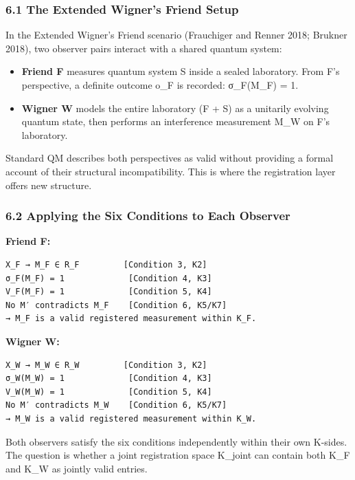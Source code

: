 \documentclass[
  11pt,
]{article}
\providecommand{\tightlist}{%
  \setlength{\itemsep}{0pt}\setlength{\parskip}{0pt}}
\begin{document}
\subsubsection{6.1 The Extended Wigner's Friend
Setup}\label{the-extended-wigners-friend-setup}

In the Extended Wigner's Friend scenario (Frauchiger and Renner 2018;
Brukner 2018), two observer pairs interact with a shared quantum system:

\begin{itemize}
\tightlist
\item
  \textbf{Friend F} measures quantum system S inside a sealed
  laboratory. From F's perspective, a definite outcome o\_F is recorded:
  σ\_F(M\_F) = 1.
\item
  \textbf{Wigner W} models the entire laboratory (F + S) as a unitarily
  evolving quantum state, then performs an interference measurement M\_W
  on F's laboratory.
\end{itemize}

Standard QM describes both perspectives as valid without providing a
formal account of their structural incompatibility. This is where the
registration layer offers new structure.

\subsubsection{6.2 Applying the Six Conditions to Each
Observer}\label{applying-the-six-conditions-to-each-observer}

\textbf{Friend F:}

\begin{verbatim}
X_F → M_F ∈ R_F         [Condition 3, K2]
σ_F(M_F) = 1             [Condition 4, K3]
V_F(M_F) = 1             [Condition 5, K4]
No M′ contradicts M_F    [Condition 6, K5/K7]
→ M_F is a valid registered measurement within K_F.
\end{verbatim}

\textbf{Wigner W:}

\begin{verbatim}
X_W → M_W ∈ R_W         [Condition 3, K2]
σ_W(M_W) = 1             [Condition 4, K3]
V_W(M_W) = 1             [Condition 5, K4]
No M′ contradicts M_W    [Condition 6, K5/K7]
→ M_W is a valid registered measurement within K_W.
\end{verbatim}

Both observers satisfy the six conditions independently within their own
K-sides. The question is whether a joint registration space K\_joint can
contain both K\_F and K\_W as jointly valid entries.
\end{document}
